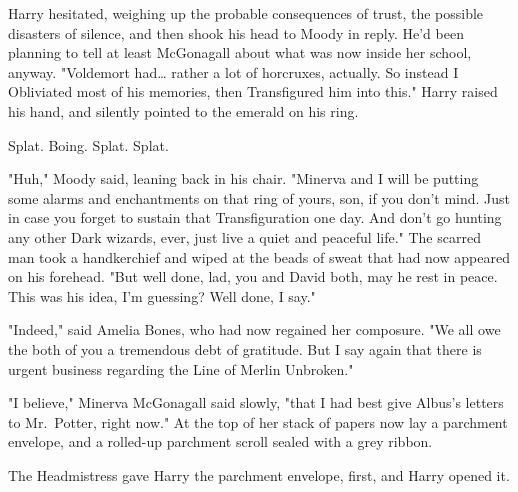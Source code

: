 Harry hesitated, weighing up the probable consequences of trust, the possible
disasters of silence, and then shook his head to Moody in reply. He'd been
planning to tell at least McGonagall about what was now inside her school,
anyway. "Voldemort had{\ldots} rather a lot of horcruxes, actually. So instead
I Obliviated most of his memories, then Transfigured him into this." Harry
raised his hand, and silently pointed to the emerald on his ring.

Splat. Boing. Splat. Splat.

"Huh," Moody said, leaning back in his chair. "Minerva and I will be putting
some alarms and enchantments on that ring of yours, son, if you don't mind.
Just in case you forget to sustain that Transfiguration one day. And don't go
hunting any other Dark wizards, ever, just live a quiet and peaceful life." The
scarred man took a handkerchief and wiped at the beads of sweat that had now
appeared on his forehead. "But well done, lad, you and David both, may he rest
in peace. This was his idea, I'm guessing? Well done, I say."

"Indeed," said Amelia Bones, who had now regained her composure. "We all owe
the both of you a tremendous debt of gratitude. But I say again that there is
urgent business regarding the Line of Merlin Unbroken."

"I believe," Minerva McGonagall said slowly, "that I had best give Albus's
letters to Mr.~Potter, right now." At the top of her stack of papers now lay a
parchment envelope, and a rolled-up parchment scroll sealed with a grey ribbon.

The Headmistress gave Harry the parchment envelope, first, and Harry opened it.
\later

